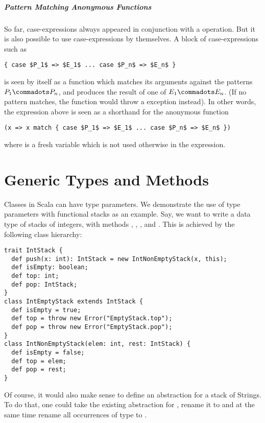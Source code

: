 \paragraph{Pattern Matching Anonymous Functions}

So far, case-expressions always appeared in conjunction with a
\verb@match@ operation. But it is also possible to use
case-expressions by themselves. A block of case-expressions such as
\begin{lstlisting}
{ case $P_1$ => $E_1$ ... case $P_n$ => $E_n$ }
\end{lstlisting}
is seen by itself as a function which matches its arguments
against the patterns $P_1 \commadots P_n$, and produces the result of
one of $E_1 \commadots E_n$. (If no pattern matches, the function
would throw a  exception instead).
In other words, the expression above is seen as a shorthand for the anonymous function
\begin{lstlisting}
(x => x match { case $P_1$ => $E_1$ ... case $P_n$ => $E_n$ })
\end{lstlisting}
where  is a fresh variable which is not used 
otherwise in the expression.

\chapter{Generic Types and Methods}

Classes in Scala can have type parameters. We demonstrate the use of
type parameters with functional stacks as an example. Say, we want to
write a data type of stacks of integers, with methods ,
, , and . This is achieved by the
following class hierarchy:
\begin{lstlisting}
trait IntStack {
  def push(x: int): IntStack = new IntNonEmptyStack(x, this);
  def isEmpty: boolean;
  def top: int;
  def pop: IntStack;
}
class IntEmptyStack extends IntStack {
  def isEmpty = true;
  def top = throw new Error("EmptyStack.top");
  def pop = throw new Error("EmptyStack.pop");
}
class IntNonEmptyStack(elem: int, rest: IntStack) {
  def isEmpty = false;
  def top = elem;
  def pop = rest;
}
\end{lstlisting}
Of course, it would also make sense to define an abstraction for a
stack of Strings. To do that, one could take the existing abstraction
for , rename it to  and at the same
time rename all occurrences of type  to .

